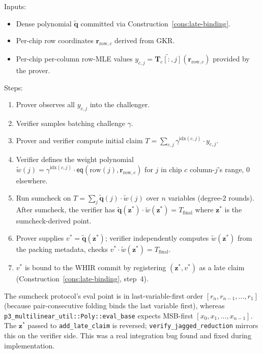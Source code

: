 \begin{construction}
\label{cons:jagged-sumcheck}
Inputs:
\begin{itemize}
  \item Dense polynomial $\widetilde{\mathbf{q}}$ committed via
        Construction~\ref{cons:late-binding}.
  \item Per-chip row coordinates $\mathbf{r}_{\mathrm{row},c}$ derived
        from GKR.
  \item Per-chip per-column row-MLE values
        $y_{c,j} = \widetilde{\mathbf{T}_c[:,j]}(\mathbf{r}_{\mathrm{row},c})$
        provided by the prover.
\end{itemize}

Steps:
\begin{enumerate}
  \item Prover observes all $y_{c,j}$ into the challenger.
  \item Verifier samples batching challenge $\gamma$.
  \item Prover and verifier compute initial claim
        $T = \sum_{c,j} \gamma^{\mathrm{idx}(c,j)} \cdot y_{c,j}$.
  \item Verifier defines the weight polynomial
        $\widetilde{w}(j) = \gamma^{\mathrm{idx}(c,j)} \cdot
        \mathsf{eq}(\mathrm{row}(j), \mathbf{r}_{\mathrm{row},c})$
        for $j$ in chip $c$ column-$j$'s range, $0$ elsewhere.
  \item Run sumcheck on $T = \sum_j \widetilde{\mathbf{q}}(j) \cdot
        \widetilde{w}(j)$ over $n$ variables (degree-$2$ rounds).
        After sumcheck, the verifier has
        $\widetilde{\mathbf{q}}(\mathbf{z}^*) \cdot
         \widetilde{w}(\mathbf{z}^*) = T_{\mathrm{final}}$
        where $\mathbf{z}^*$ is the sumcheck-derived point.
  \item Prover supplies $v^* = \widetilde{\mathbf{q}}(\mathbf{z}^*)$;
        verifier independently computes $\widetilde{w}(\mathbf{z}^*)$
        from the packing metadata, checks
        $v^* \cdot \widetilde{w}(\mathbf{z}^*) = T_{\mathrm{final}}$.
  \item $v^*$ is bound to the WHIR commit by registering
        $(\mathbf{z}^*, v^*)$ as a late claim
        (Construction~\ref{cons:late-binding}, step~4).
\end{enumerate}
\end{construction}

\begin{remark}
The sumcheck protocol's eval point is in last-variable-first order
$[r_n, r_{n-1}, \ldots, r_1]$ (because pair-consecutive folding
binds the last variable first), whereas
\texttt{p3\_multilinear\_util::Poly::eval\_base} expects MSB-first
$[x_0, x_1, \ldots, x_{n-1}]$.  The $\mathbf{z}^*$ passed to
\texttt{add\_late\_claim} is reversed; \texttt{verify\_jagged\_reduction}
mirrors this on the verifier side.  This was a real integration
bug found and fixed during implementation.
\end{remark}

